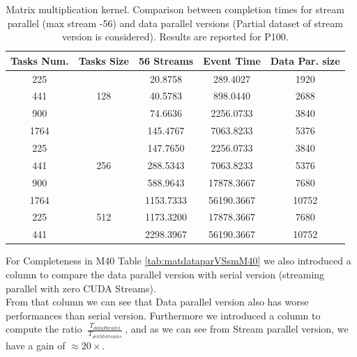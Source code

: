 \begin{itemize}
\begin{table}[!h]
\begin{tabular}{ | c  c || c | c  || c | }
		
			\textbf{Tasks Num.}&	\textbf{Tasks Size}&	\textbf{56 Streams}&	\textbf{Event Time}&	\textbf{Data Par. size}\\
			\hline	\hline	
			225&	\multirow{3}{*}{128}&	20.8758	& 289.4027&	1920\\
			441	& &	40.5783&	898.0440&	2688\\
			900	& &	74.6636&	2256.0733&	3840\\
			1764& &	145.4767&	7063.8233&	5376\\
			\hline
			225&	\multirow{3}{*}{256}&	147.7650&	2256.0733&	3840\\
			441	& &	288.5343&	7063.8233&	5376\\
			900	& &	588.9643&	17878.3667&	7680\\
			1764& &	1153.7333&	56190.3667&	10752\\
			\hline
			225&	\multirow{1}{*}{512}&	1173.3200&	17878.3667&	7680\\
			441	& &	2298.3967&	56190.3667&	10752\\
			\hline
		\end{tabular}
		\caption{Matrix multiplication kernel. Comparison between completion times for stream parallel (max stream -56) and data parallel versions (Partial dataset of stream version is considered). Results are reported for P100.}	
		\label{tab:matdataparVSsmP100}		
	\end{table}
	
	For Completeness in M40 Table \ref{tab:matdataparVSsmM40} we also introduced a column to compare the data parallel version with serial version (streaming parallel with zero CUDA Streams).\\
	From that column we can see that Data parallel version also has worse performances than serial version.
	Furthermore we introduced a column to compute the ratio \( \ \frac{T_{dataParallel}}{T_{\#SM streams}} \ \), and as we can see  from Stream parallel version, we have a gain of \(\approx 20\times\).
	
	\begin{table}[!h]
		\centering
		\begin{tabular}{ | c  c || c | c  || c | c | c  | } 
			\hline
		

\end{tabular}
\end{table}
\end{itemize}
